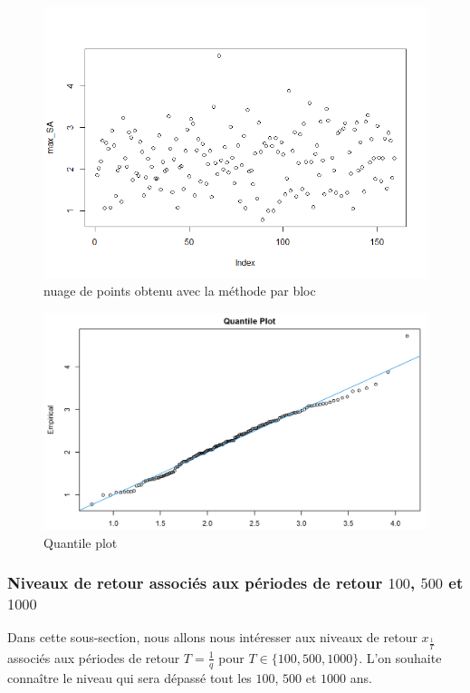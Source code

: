 \documentclass[a4paper,french,10pt]{article}
\begin{document}
 \begin{figure}[htp] 
 	\centering
 	\includegraphics[scale=0.45]{images/graph_max.png}
 	\caption{nuage de points obtenu avec la méthode par bloc}
 	\label{graph_max}
 \end{figure}

\begin{figure}[htp] 
	\centering
	\includegraphics[scale=0.45]{images/quantilePlotUnivarie.png}
	\caption{Quantile plot}
	\label{qplot}
\end{figure}

\newpage

\subsubsection{Niveaux de retour associés aux périodes de retour $100$, $500$ et $1000$}

Dans cette sous-section, nous allons nous intéresser aux niveaux de retour $x_{\frac{1}{T}}$ associés aux périodes de retour $T = \frac{1}{q}$ pour $T \in \{100,500,1000\}$. L'on souhaite connaître le niveau qui sera dépassé tout les $100$, $500$ et $1000$ ans.
\end{document}
